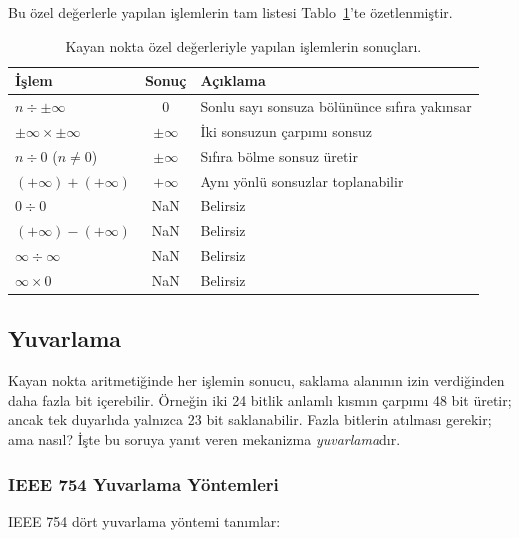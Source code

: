 Bu özel değerlerle yapılan işlemlerin tam listesi Tablo~\ref{tab:ozel-degerler}'te özetlenmiştir.

\begin{table}[htbp]
\centering
\caption[Özel değerlerle yapılan işlemler]{Kayan nokta özel değerleriyle yapılan işlemlerin sonuçları.}
\label{tab:ozel-degerler}
\small
\begin{tabular}{l c l}
\toprule
\textbf{İşlem} & \textbf{Sonuç} & \textbf{Açıklama} \\
\midrule
$n \div \pm\infty$ & $0$ & Sonlu sayı sonsuza bölününce sıfıra yakınsar \\
$\pm\infty \times \pm\infty$ & $\pm\infty$ & İki sonsuzun çarpımı sonsuz \\
$n \div 0$ \; ($n \neq 0$) & $\pm\infty$ & Sıfıra bölme sonsuz üretir \\
$(+\infty) + (+\infty)$ & $+\infty$ & Aynı yönlü sonsuzlar toplanabilir \\
\midrule
$0 \div 0$ & NaN & Belirsiz \\
$(+\infty) - (+\infty)$ & NaN & Belirsiz \\
$\infty \div \infty$ & NaN & Belirsiz \\
$\infty \times 0$ & NaN & Belirsiz \\
\bottomrule
\end{tabular}
\end{table}

\subsection{Yuvarlama}

Kayan nokta aritmetiğinde her işlemin sonucu, saklama alanının izin verdiğinden daha fazla bit içerebilir. Örneğin iki 24 bitlik anlamlı kısmın çarpımı 48 bit üretir; ancak tek duyarlıda yalnızca 23 bit saklanabilir. Fazla bitlerin atılması gerekir; ama nasıl? İşte bu soruya yanıt veren mekanizma \emph{yuvarlama}dır.

\subsubsection{IEEE 754 Yuvarlama Yöntemleri}

IEEE 754 dört yuvarlama yöntemi tanımlar:

